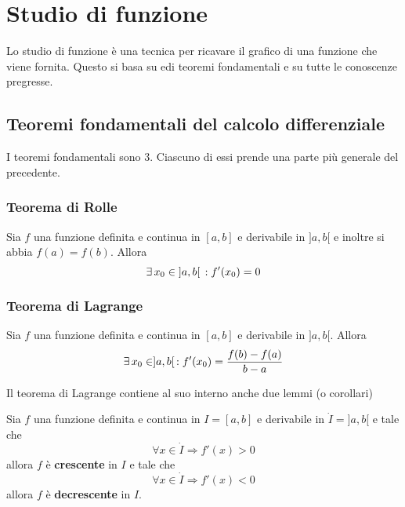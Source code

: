 
\section{Studio di funzione}
Lo studio di funzione è una tecnica per ricavare il grafico di una funzione che viene fornita. Questo
si basa su edi teoremi fondamentali e su tutte le conoscenze pregresse.

\subsection{Teoremi fondamentali del calcolo differenziale}
I teoremi fondamentali sono 3. Ciascuno di essi prende una parte più generale del precedente.
\subsubsection{Teorema di Rolle}
\begin{rolle}\hypertarget{teor:rolle}{}
  Sia $f$ una funzione definita e continua in $[a,b]$ e derivabile in $]a,b[$ e inoltre si abbia
  $f(a) = f(b)$. Allora
  \begin{equation*}
    \exists\,x_0\in{]a,b[}\,: f'(x_0)=0
  \end{equation*}
\end{rolle}

\subsubsection{Teorema di Lagrange}
\begin{lagrangeDef}\hypertarget{teor:lagrange}{}
  Sia $f$ una funzione definita e continua in $[a,b]$ e derivabile in $]a,b[$. Allora
  \begin{equation*}
    \exists\,x_0\in]a,b[\,: f'(x_0) = \frac{f(b)-f(a)}{b-a}
  \end{equation*}
\end{lagrangeDef}
Il teorema di Lagrange contiene al suo interno anche due lemmi (o corollari)

\begin{lagrangeLemma1}\hypertarget{teor:lagrange:1}{}
  Sia $f$ una funzione definita e continua in $I=[a,b]$ e derivabile in $\dot{I}=]a,b[$ e tale che
  \begin{equation*}
    \forall x\in\dot{I} \Rightarrow f'(x)>0
  \end{equation*}
  allora $f$ è \textbf{crescente} in $I$ e tale che
  \begin{equation*}
    \forall x\in\dot{I} \Rightarrow f'(x)<0
  \end{equation*}
  allora $f$ è \textbf{decrescente} in $I$.
\end{lagrangeLemma1}

